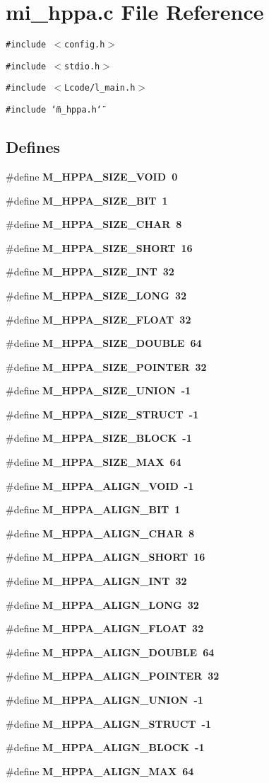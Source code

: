 \section{mi\_\-hppa.c File Reference}
\label{mi__hppa_8c}
{\tt \#include $<$config.h$>$}\par
{\tt \#include $<$stdio.h$>$}\par
{\tt \#include $<$Lcode/l\_\-main.h$>$}\par
{\tt \#include \char`\"{}m\_\-hppa.h\char`\"{}}\par
\subsection*{Defines}
\begin{CompactItemize}
\item 
\#define \bf{M\_\-HPPA\_\-SIZE\_\-VOID}~0
\item 
\#define \bf{M\_\-HPPA\_\-SIZE\_\-BIT}~1
\item 
\#define \bf{M\_\-HPPA\_\-SIZE\_\-CHAR}~8
\item 
\#define \bf{M\_\-HPPA\_\-SIZE\_\-SHORT}~16
\item 
\#define \bf{M\_\-HPPA\_\-SIZE\_\-INT}~32
\item 
\#define \bf{M\_\-HPPA\_\-SIZE\_\-LONG}~32
\item 
\#define \bf{M\_\-HPPA\_\-SIZE\_\-FLOAT}~32
\item 
\#define \bf{M\_\-HPPA\_\-SIZE\_\-DOUBLE}~64
\item 
\#define \bf{M\_\-HPPA\_\-SIZE\_\-POINTER}~32
\item 
\#define \bf{M\_\-HPPA\_\-SIZE\_\-UNION}~-1
\item 
\#define \bf{M\_\-HPPA\_\-SIZE\_\-STRUCT}~-1
\item 
\#define \bf{M\_\-HPPA\_\-SIZE\_\-BLOCK}~-1
\item 
\#define \bf{M\_\-HPPA\_\-SIZE\_\-MAX}~64
\item 
\#define \bf{M\_\-HPPA\_\-ALIGN\_\-VOID}~-1
\item 
\#define \bf{M\_\-HPPA\_\-ALIGN\_\-BIT}~1
\item 
\#define \bf{M\_\-HPPA\_\-ALIGN\_\-CHAR}~8
\item 
\#define \bf{M\_\-HPPA\_\-ALIGN\_\-SHORT}~16
\item 
\#define \bf{M\_\-HPPA\_\-ALIGN\_\-INT}~32
\item 
\#define \bf{M\_\-HPPA\_\-ALIGN\_\-LONG}~32
\item 
\#define \bf{M\_\-HPPA\_\-ALIGN\_\-FLOAT}~32
\item 
\#define \bf{M\_\-HPPA\_\-ALIGN\_\-DOUBLE}~64
\item 
\#define \bf{M\_\-HPPA\_\-ALIGN\_\-POINTER}~32
\item 
\#define \bf{M\_\-HPPA\_\-ALIGN\_\-UNION}~-1
\item 
\#define \bf{M\_\-HPPA\_\-ALIGN\_\-STRUCT}~-1
\item 
\#define \bf{M\_\-HPPA\_\-ALIGN\_\-BLOCK}~-1
\item 
\#define \bf{M\_\-HPPA\_\-ALIGN\_\-MAX}~64
\end{CompactItemize}
